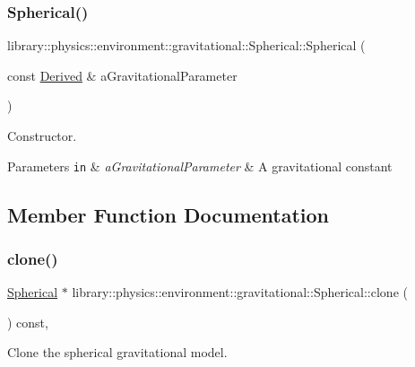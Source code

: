 \subsubsection{\texorpdfstring{Spherical()}{Spherical()}}
{\footnotesize\ttfamily library\+::physics\+::environment\+::gravitational\+::\+Spherical\+::\+Spherical (\begin{DoxyParamCaption}\item[{const \hyperlink{classlibrary_1_1physics_1_1units_1_1_derived}{Derived} \&}]{a\+Gravitational\+Parameter }\end{DoxyParamCaption})}



Constructor. 


\begin{DoxyParams}[1]{Parameters}
\mbox{\tt in}  & {\em a\+Gravitational\+Parameter} & A gravitational constant \\
\hline
\end{DoxyParams}


\subsection{Member Function Documentation}
\mbox{\label{classlibrary_1_1physics_1_1environment_1_1gravitational_1_1_spherical_a4f27273f7e9897e9d67607a8b7b0bca7}} 
\subsubsection{\texorpdfstring{clone()}{clone()}}
{\footnotesize\ttfamily \hyperlink{classlibrary_1_1physics_1_1environment_1_1gravitational_1_1_spherical}{Spherical} $\ast$ library\+::physics\+::environment\+::gravitational\+::\+Spherical\+::clone (\begin{DoxyParamCaption}{ }\end{DoxyParamCaption}) const\hspace{0.3cm}{\ttfamily [override]}, {\ttfamily [virtual]}}



Clone the spherical gravitational model. 

